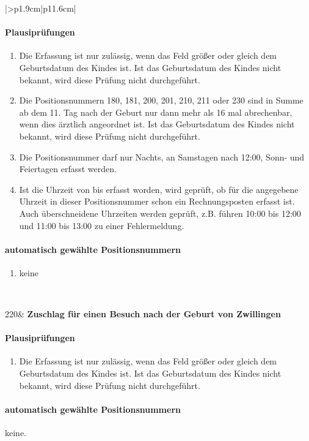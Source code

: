 \begin{mpsupertabular}{|>{\centering}p{1.9cm}|p{11.6cm}|}
\paragraph{Plausiprüfungen}
\begin{enumerate}
\item
Die Erfassung ist nur zulässig, wenn das Feld  größer 
oder gleich dem Geburtsdatum des Kindes ist. Ist das Geburtsdatum des
Kindes nicht bekannt, wird diese Prüfung nicht durchgeführt.
\item
Die Positionsnummern 180, 181, 200, 201, 210, 211 oder 230 sind in Summe 
ab dem 11. Tag nach der Geburt nur dann mehr 
als 16 mal abrechenbar, wenn dies ärztlich angeordnet ist.
Ist das Geburtsdatum des
Kindes nicht bekannt, wird diese Prüfung nicht durchgeführt.
\item
Die Positionsnummer darf nur Nachts, an Samstagen nach 12:00, 
Sonn- und Feiertagen erfasst werden.
\item
Ist die Uhrzeit von bis erfasst worden, wird geprüft, ob für die angegebene 
Uhrzeit in dieser Positionsnummer
schon ein Rechnungsposten erfasst ist. Auch überschneidene Uhrzeiten
werden geprüft, z.B. führen 10:00 bis 12:00 und 11:00 bis 13:00 zu einer
Fehlermeldung.
\end{enumerate}
\paragraph{automatisch gewählte Positionsnummern}
\begin{enumerate}
\item
keine
\end{enumerate}
\\ \hline



220&
\textbf{Zuschlag für einen Besuch nach der Geburt von Zwillingen}
\paragraph{Plausiprüfungen}
\begin{enumerate}
\item
Die Erfassung ist nur zulässig, wenn das Feld  größer 
oder gleich dem Geburtsdatum des Kindes ist. Ist das Geburtsdatum des
Kindes nicht bekannt, wird diese Prüfung nicht durchgeführt.
\end{enumerate}
\paragraph{automatisch gewählte Positionsnummern}
keine.
\\ \hline



\end{mpsupertabular}
